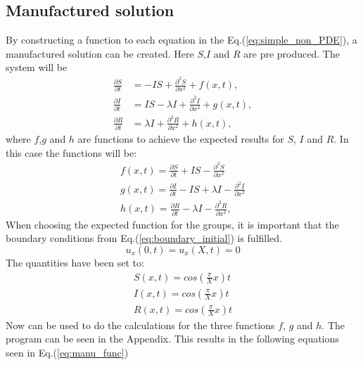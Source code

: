 \documentclass[%
twoside,                 %
final,                   %
10pt]{article}
\begin{document}
\subsection{Manufactured solution}
By constructing a function to each equation in the Eq.(\ref{eq:simple_non_PDE}), a manufactured solution can be created. Here $S$,$I$ and $R$ are pre produced. The system will be
\begin{equation} \label{eq:simple_non_PDE2}
	\begin{aligned}
	\frac{\partial S}{\partial t} &= -IS + \frac{\partial^2 S}{\partial x^2}+f(x,t),\\
	\frac{\partial I}{\partial t} &= IS- \lambda I + \frac{\partial^2 I}{\partial x^2}+g(x,t),\\
	\frac{\partial R}{\partial t} &= \lambda I + \frac{\partial^2 R}{\partial x^2}+h(x,t),
	\end{aligned}
\end{equation}
where $f$,$g$ and $h$ are functions to achieve the expected results for $S$, $I$ and $R$. In this case the functions will be:
\begin{equation}
	\begin{aligned}
	f(x,t) = \frac{\partial S}{\partial t} + IS - \frac{\partial^2 S}{\partial x^2}\\
	g(x,t) = \frac{\partial I}{\partial t} - IS + \lambda I - \frac{\partial^2 I}{\partial x^2}\\
	h(x,t) = \frac{\partial R}{\partial t} -\lambda I - \frac{\partial^2 R}{\partial x^2},
	\end{aligned}
\end{equation}
When choosing the expected function for the groups, it is important that the boundary conditions from Eq.(\ref{eq:boundary_initial}) is fulfilled.
\begin{equation}
    u_x(0,t) = u_x(X,t) = 0
\end{equation}
The quantities have been set to:
\begin{equation}
	\begin{aligned}
    S(x,t) = cos(\frac{\pi}{X}x)t\\
    I(x,t) = cos(\frac{\pi}{X}x)t\\
    R(x,t) = cos(\frac{\pi}{X}x)t
	\end{aligned}
\end{equation}
Now  can be used to do the calculations for the three functions $f$, $g$ and $h$. The program can be seen in the Appendix. This results in the following equations seen in Eq.(\ref{eq:manu_func}) 
\end{document}

